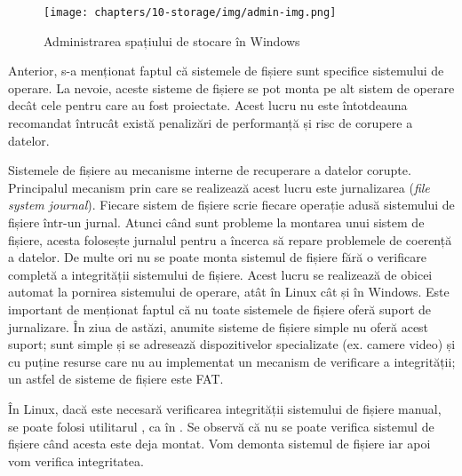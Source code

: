 \begin{figure}[!htbp]
  \centering
  \texttt{[image: chapters/10-storage/img/admin-img.png]}
  \caption{Administrarea spațiului de stocare în Windows}
  \label{fig:storage:win-disk-manage}
\end{figure}

Anterior, s-a menționat faptul că sistemele de fișiere sunt specifice sistemului de operare.
La nevoie, aceste sisteme de fișiere se pot monta pe alt sistem de operare decât cele pentru care au fost proiectate.
Acest lucru nu este întotdeauna recomandat întrucât există penalizări de performanță și risc de corupere a datelor.

Sistemele de fișiere au mecanisme interne de recuperare a datelor corupte.
 Principalul mecanism prin care se realizează acest lucru este jurnalizarea (\textit{file system journal}).
Fiecare sistem de fișiere scrie fiecare operație adusă sistemului de fișiere într-un jurnal.
Atunci când sunt probleme la montarea unui sistem de fișiere, acesta folosește jurnalul pentru a încerca să repare problemele de coerență a datelor.
De multe ori nu se poate monta sistemul de fișiere fără o verificare completă a integrității sistemului de fișiere.
Acest lucru se realizează de obicei automat la pornirea sistemului de operare, atât în Linux cât și în Windows.
Este important de menționat faptul că nu toate sistemele de fișiere oferă suport de jurnalizare.
În ziua de astăzi, anumite sisteme de fișiere simple nu oferă acest suport;
sunt simple și se adresează dispozitivelor specializate (ex. camere video) și cu puține resurse care nu au implementat un mecanism de verificare a integrității;
un astfel de sisteme de fișiere este FAT.

În Linux, dacă este necesară verificarea integrității sistemului de fișiere manual, se poate folosi utilitarul , ca în .
 Se observă că nu se poate verifica sistemul de fișiere când acesta este deja montat.
Vom demonta sistemul de fișiere iar apoi vom verifica integritatea.


